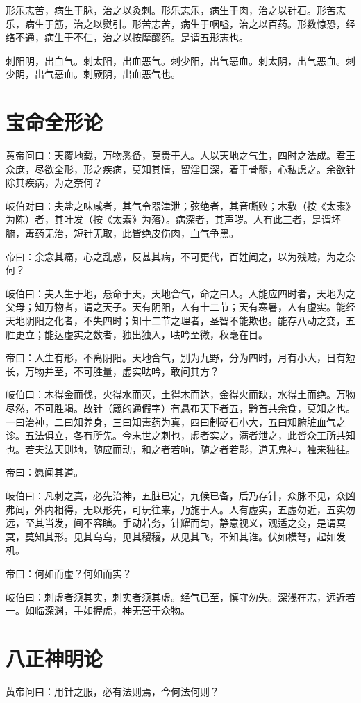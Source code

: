 \documentclass{article}%
\begin{document}
形乐志苦，病生于脉，治之以灸刺。形乐志乐，病生于肉，治之以针石。形苦志乐，病生于筋，治之以熨引。形苦志苦，病生于咽嗌，治之以百药。形数惊恐，经络不通，病生于不仁，治之以按摩醪药。是谓五形志也。

刺阳明，出血气。刺太阳，出血恶气。刺少阳，出气恶血。刺太阴，出气恶血。刺少阴，出气恶血。刺厥阴，出血恶气也。
\section{宝命全形论}
黄帝问曰：天覆地载，万物悉备，莫贵于人。人以天地之气生，四时之法成。君王众庶，尽欲全形，形之疾病，莫知其情，留淫日深，着于骨髓，心私虑之。余欲针除其疾病，为之奈何？

岐伯对曰：夫盐之味咸者，其气令器津泄；弦绝者，其音嘶败；木敷（按《太素》为陈）者，其叶发（按《太素》为落）。病深者，其声哕。人有此三者，是谓坏腑，毒药无治，短针无取，此皆绝皮伤肉，血气争黑。

帝曰：余念其痛，心之乱惑，反甚其病，不可更代，百姓闻之，以为残贼，为之奈何？

岐伯曰：夫人生于地，悬命于天，天地合气，命之曰人。人能应四时者，天地为之父母；知万物者，谓之天子。天有阴阳，人有十二节；天有寒暑，人有虚实。能经天地阴阳之化者，不失四时；知十二节之理者，圣智不能欺也。能存八动之变，五胜更立；能达虚实之数者，独出独入，呿吟至微，秋毫在目。

帝曰：人生有形，不离阴阳。天地合气，别为九野，分为四时，月有小大，日有短长，万物并至，不可胜量，虚实呿吟，敢问其方？

岐伯曰：木得金而伐，火得水而灭，土得木而达，金得火而缺，水得土而绝。万物尽然，不可胜竭。故针（箴的通假字）有悬布天下者五，黔首共余食，莫知之也。一曰治神，二曰知养身，三曰知毒药为真，四曰制砭石小大，五曰知腑脏血气之诊。五法俱立，各有所先。今末世之刺也，虚者实之，满者泄之，此皆众工所共知也。若夫法天则地，随应而动，和之者若响，随之者若影，道无鬼神，独来独往。

帝曰：愿闻其道。

岐伯曰：凡刺之真，必先治神，五脏已定，九候已备，后乃存针，众脉不见，众凶弗闻，外内相得，无以形先，可玩往来，乃施于人。人有虚实，五虚勿近，五实勿远，至其当发，间不容瞚。手动若务，针耀而匀，静意视义，观适之变，是谓冥冥，莫知其形。见其乌乌，见其稷稷，从见其飞，不知其谁。伏如横弩，起如发机。

帝曰：何如而虚？何如而实？

岐伯曰：刺虚者须其实，刺实者须其虚。经气已至，慎守勿失。深浅在志，远近若一。如临深渊，手如握虎，神无营于众物。
\section{八正神明论}
黄帝问曰：用针之服，必有法则焉，今何法何则？
\end{document}
